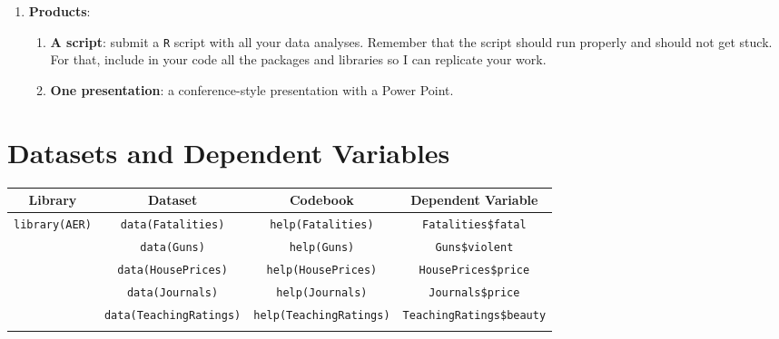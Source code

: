 \documentclass[10pt]{article}
\begin{document}
\begin{enumerate}
	\item {\bf Products}: 

		\begin{enumerate}
			\item {\bf A script}: submit a \texttt{R} script with all your data analyses. Remember that the script should run properly and should not get stuck. For that, include in your code all the packages and libraries so I can replicate your work.  
			\item {\bf One presentation}: a conference-style presentation with a Power Point.
		\end{enumerate}

\end{enumerate}

\newpage
\section*{Datasets and Dependent Variables}


\begin{table}[ph!]
\begin{center}
\begin{scriptsize}
{\renewcommand{\arraystretch}{2}%
\begin{tabular}{  c |  c | c | c }
\toprule
\textbf{Library}             & \textbf{Dataset}  & \textbf{Codebook} & \textbf{Dependent Variable} \\
\midrule
\multirow{6}{*}{\texttt{library(AER)}}  & \texttt{data(Fatalities)}      & \texttt{help(Fatalities)}      & \texttt{Fatalities\$fatal} \\\cline{2-4}
                                        & \texttt{data(Guns)}            & \texttt{help(Guns)}            & \texttt{Guns\$violent} \\\cline{2-4}
                                        & \texttt{data(HousePrices)}     & \texttt{help(HousePrices)}     & \texttt{HousePrices\$price} \\\cline{2-4}
                                        & \texttt{data(Journals)}        & \texttt{help(Journals)}        & \texttt{Journals\$price} \\\cline{2-4}
                                        & \texttt{data(TeachingRatings)} & \texttt{help(TeachingRatings)} & \texttt{TeachingRatings\$beauty} \\\cline{2-4}
\bottomrule
\end{tabular}}
\end{scriptsize}
\end{center}
\end{table}
\end{document}
